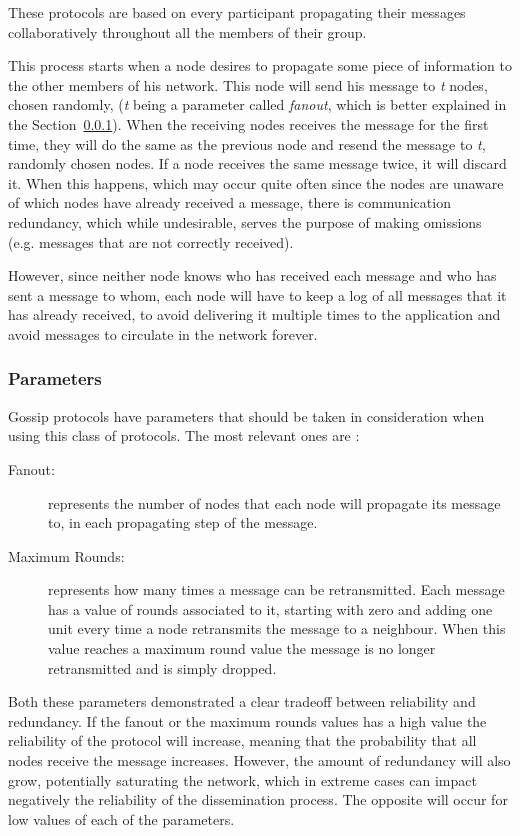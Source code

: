 These protocols are based on every participant propagating their messages collaboratively
throughout all the members of their group.

This process starts when a node desires to propagate some piece of information to the other
members of his network. This node will send his message to \textit{t} nodes, chosen randomly,
(\textit{t} being a parameter called \textit{fanout}, which is better explained in the
Section~\ref{subsubsec:gossip_parameters}). When the receiving nodes receives the message for
the first time, they will do the same as the previous node and resend the message to
\textit{t}, randomly chosen nodes. If a node receives the same message twice, it will discard
it. When this happens, which may occur quite often since the nodes are unaware of which nodes
have already received a message, there is communication redundancy, which while undesirable,
serves the purpose of making omissions (e.g. messages that are not correctly received).

However, since neither node knows who has received each message and who has sent a
message to whom, each node will have to keep a log of all messages that it has already
received, to avoid delivering it multiple times to the application and avoid messages
to circulate in the network forever.


\subsubsection{Parameters}
\label{subsubsec:gossip_parameters}
Gossip protocols have parameters that should be taken in consideration when using this
class of protocols. The most relevant ones are \cite{Leitao2012}:
\begin{description}
      \item[Fanout:] represents the number of nodes that each node will propagate its message
            to, in each propagating step of the message.
      \item[Maximum Rounds:] represents how many times a message can be retransmitted. Each
            message has a value of rounds associated to it, starting with zero and adding one
            unit every time a node retransmits the message to a neighbour. When this value
            reaches a maximum round value the message is no longer retransmitted and is simply
            dropped.
\end{description}

Both these parameters demonstrated a clear tradeoff between reliability and redundancy. If
the fanout or the maximum rounds values has a high value the reliability of the protocol will
increase, meaning that the probability that all nodes receive the message increases. However,
the amount of redundancy will also grow, potentially saturating the network, which in extreme
cases can impact negatively the reliability of the dissemination process. The opposite will
occur for low values of each of the parameters.


